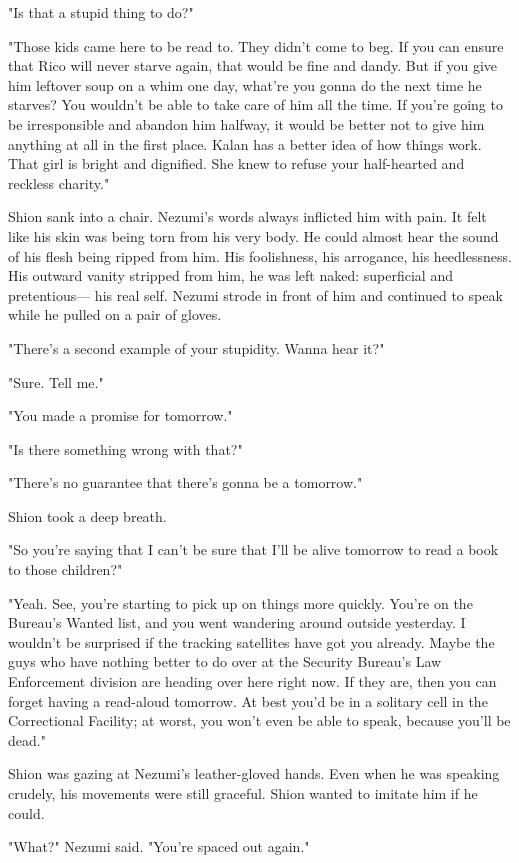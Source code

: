 "Is that a stupid thing to do?"

"Those kids came here to be read to. They didn't come to beg. If you can
ensure that Rico will never starve again, that would be fine and dandy.
But if you give him leftover soup on a whim one day, what're you gonna
do the next time he starves? You wouldn't be able to take care of him
all the time. If you're going to be irresponsible and abandon him
halfway, it would be better not to give him anything at all in the first
place. Kalan has a better idea of how things work. That girl is bright
and dignified. She knew to refuse your half-hearted and reckless
charity."

Shion sank into a chair. Nezumi's words always inflicted him with pain.
It felt like his skin was being torn from his very body. He could almost
hear the sound of his flesh being ripped from him. His foolishness, his
arrogance, his heedlessness. His outward vanity stripped from him, he
was left naked: superficial and pretentious--- his real self. Nezumi
strode in front of him and continued to speak while he pulled on a pair
of gloves.

"There's a second example of your stupidity. Wanna hear it?"

"Sure. Tell me."

"You made a promise for tomorrow."

"Is there something wrong with that?"

"There's no guarantee that there's gonna be a tomorrow."

Shion took a deep breath.

"So you're saying that I can't be sure that I'll be alive tomorrow to
read a book to those children?"

"Yeah. See, you're starting to pick up on things more quickly. You're on
the Bureau's Wanted list, and you went wandering around outside
yesterday. I wouldn't be surprised if the tracking satellites have got
you already. Maybe the guys who have nothing better to do over at the
Security Bureau's Law Enforcement division are heading over here right
now. If they are, then you can forget having a read-aloud tomorrow. At
best you'd be in a solitary cell in the Correctional Facility; at worst,
you won't even be able to speak, because you'll be dead."

Shion was gazing at Nezumi's leather-gloved hands. Even when he was
speaking crudely, his movements were still graceful. Shion wanted to
imitate him if he could.

"What?" Nezumi said. "You're spaced out again."

